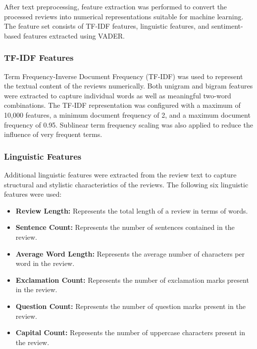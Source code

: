 \documentclass[12pt,a4paper]{report}
\begin{document}
After text preprocessing, feature extraction was performed to convert the processed reviews into numerical representations suitable for machine learning. The feature set consists of TF-IDF features, linguistic features, and sentiment-based features extracted using VADER.

\subsubsection*{TF-IDF Features}

Term Frequency-Inverse Document Frequency (TF-IDF) was used to represent the textual content of the reviews numerically. Both unigram and bigram features were extracted to capture individual words as well as meaningful two-word combinations. The TF-IDF representation was configured with a maximum of 10,000 features, a minimum document frequency of 2, and a maximum document frequency of 0.95. Sublinear term frequency scaling was also applied to reduce the influence of very frequent terms.

\subsubsection*{Linguistic Features}

Additional linguistic features were extracted from the review text to capture structural and stylistic characteristics of the reviews. The following six linguistic features were used:

\begin{itemize}
    \item \textbf{Review Length:} Represents the total length of a review in terms of words.
    
    \item \textbf{Sentence Count:} Represents the number of sentences contained in the review.
    
    \item \textbf{Average Word Length:} Represents the average number of characters per word in the review.
    
    \item \textbf{Exclamation Count:} Represents the number of exclamation marks present in the review.
    
    \item \textbf{Question Count:} Represents the number of question marks present in the review.
    
    \item \textbf{Capital Count:} Represents the number of uppercase characters present in the review.
\end{itemize}
\end{document}
